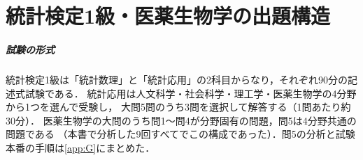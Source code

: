 \chapter*{統計検定1級・医薬生物学の出題構造}

\paragraph{試験の形式}
統計検定1級は「統計数理」と「統計応用」の2科目からなり，それぞれ90分の記述式試験である．
統計応用は人文科学・社会科学・理工学・医薬生物学の4分野から1つを選んで受験し，
大問5問のうち3問を選択して解答する（1問あたり約30分）\cite{web:lec,web:academaid}．
医薬生物学の大問のうち問1〜問4が分野固有の問題，問5は4分野共通の問題である
（本書で分析した9回すべてでこの構成であった）．問5の分析と試験本番の手順は\cref{app:G}にまとめた．

